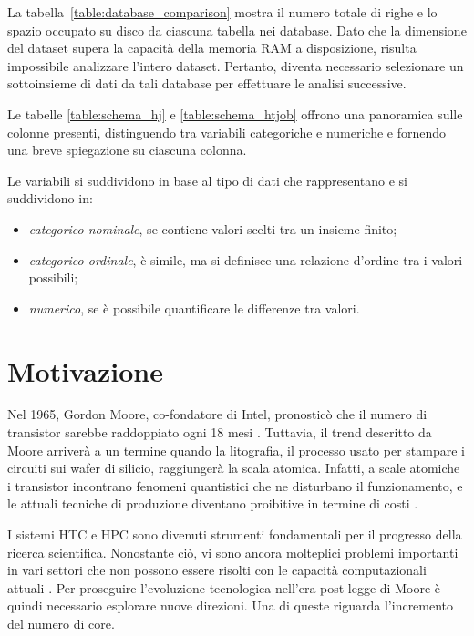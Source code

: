 La tabella~\ref{table:database_comparison} mostra il numero totale di righe e
lo spazio occupato su disco da ciascuna tabella nei database. Dato che la
dimensione del dataset supera la capacità della memoria RAM a disposizione,
risulta impossibile analizzare l'intero dataset. Pertanto, diventa necessario
selezionare un sottoinsieme di dati da tali database per effettuare le analisi
successive.

Le tabelle \ref{table:schema_hj} e \ref{table:schema_htjob} offrono una
panoramica sulle colonne presenti, distinguendo tra variabili categoriche e
numeriche e fornendo una breve spiegazione su ciascuna colonna. 

Le variabili si suddividono in base al tipo di dati che rappresentano e si
suddividono in: 

\begin{itemize}
    \item \textit{categorico nominale}, se contiene valori scelti tra un
        insieme finito;
    \item \textit{categorico ordinale}, è simile, ma si definisce una
        relazione d'ordine tra i valori possibili;
    \item \textit{numerico}, se è possibile quantificare le differenze tra valori.
\end{itemize}

\section{Motivazione}

Nel 1965, Gordon Moore, co-fondatore di Intel, pronosticò che il numero di
transistor sarebbe raddoppiato ogni 18 mesi \cite{Moore1965}. Tuttavia, il
trend descritto da Moore arriverà a un termine quando la litografia, il
processo usato per stampare i circuiti sui wafer di silicio, raggiungerà la
scala atomica. Infatti, a scale atomiche i transistor incontrano fenomeni
quantistici che ne disturbano il funzionamento, e le attuali tecniche di
produzione diventano proibitive in termine di costi \cite{Shalf2015,
Theis2017}.

I sistemi HTC e HPC sono divenuti strumenti fondamentali per il progresso
della ricerca scientifica. Nonostante ciò, vi sono ancora molteplici problemi
importanti in vari settori che non possono essere risolti con le capacità
computazionali attuali \cite{Villa2014}. Per proseguire l'evoluzione
tecnologica nell'era post-legge di Moore è quindi necessario esplorare nuove
direzioni. Una di queste riguarda l'incremento del numero di core.

